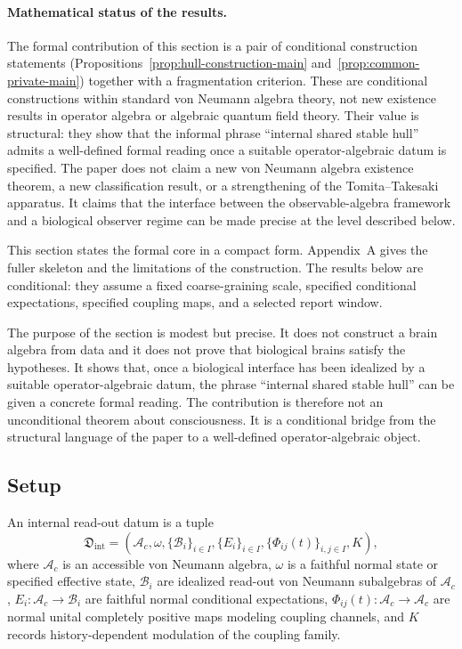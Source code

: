 \documentclass[12pt]{article}
\theoremstyle{definition}
\theoremstyle{remark}
\newcommand{\Ac}{\mathcal A_c}
\begin{document}
\paragraph{Mathematical status of the results.}
The formal contribution of this section is a pair of conditional
construction statements (Propositions~\ref{prop:hull-construction-main}
and~\ref{prop:common-private-main}) together with a fragmentation
criterion. These are conditional constructions within standard von
Neumann algebra theory, not new existence results in operator algebra
or algebraic quantum field theory. Their value is structural: they show
that the informal phrase ``internal shared stable hull'' admits a
well-defined formal reading once a suitable operator-algebraic datum is
specified. The paper does not claim a new von Neumann algebra existence
theorem, a new classification result, or a strengthening of the
Tomita--Takesaki apparatus. It claims that the interface between the
observable-algebra framework and a biological observer regime can be
made precise at the level described below.

This section states the formal core in a compact form. Appendix~A gives
the fuller skeleton and the limitations of the construction. The
results below are conditional: they assume a fixed coarse-graining
scale, specified conditional expectations, specified coupling maps, and
a selected report window.

The purpose of the section is modest but precise. It does not construct
a brain algebra from data and it does not prove that biological brains
satisfy the hypotheses. It shows that, once a biological interface has
been idealized by a suitable operator-algebraic datum, the phrase
``internal shared stable hull'' can be given a concrete formal reading.
The contribution is therefore not an unconditional theorem about
consciousness. It is a conditional bridge from the structural language
of the paper to a well-defined operator-algebraic object.

\subsection{Setup}

An internal read-out datum is a tuple
\[
\mathfrak D_{\mathrm{int}}
=
(\Ac,\omega,\{\mathcal B_i\}_{i\in I},\{E_i\}_{i\in I},
\{\Phi_{ij}(t)\}_{i,j\in I},K),
\]
where \(\Ac\) is an accessible von Neumann algebra, \(\omega\) is a
faithful normal state or specified effective state, \(\mathcal B_i\) are
idealized read-out von Neumann subalgebras of \(\Ac\),
\(E_i:\Ac\to\mathcal B_i\) are faithful normal conditional
expectations, \(\Phi_{ij}(t):\Ac\to\Ac\) are normal unital completely
positive maps modeling coupling channels, and \(K\) records
history-dependent modulation of the coupling family.
\end{document}
